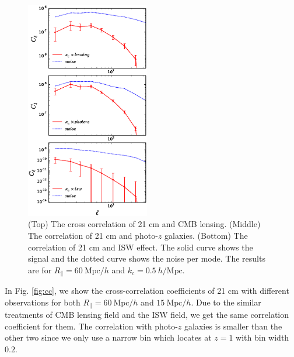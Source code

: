 \documentclass[aps,prl,twocolumn,showpacs,superscriptaddress,groupedaddress,nofootinbib,floatfix]{revtex4}  %
\newcommand{\mr}{\mathrm}
\begin{document}
\begin{figure}[tbp]
\begin{center}
\includegraphics[width=0.48\textwidth]{f8.eps}
\end{center}
\vspace{-1.9cm}
\caption{(Top) The cross correlation of 21 cm and CMB lensing.
(Middle) The correlation of 21 cm and photo-$z$ galaxies. (Bottom) The
correlation of 21 cm and ISW effect. The solid curve shows the signal and the 
dotted curve shows the noise per mode. The results are 
for $R_\parallel=60\ \mr{Mpc}/h$ and $k_c=0.5\ h/\mr{Mpc}$.}
\label{fig:cs}
\end{figure}

In Fig. \ref{fig:cc}, we show the cross-correlation coefficients of 21 cm with 
different observations for both $R_\parallel=60\ \mr{Mpc}/h$ and 
$15\ \mr{Mpc}/h$. Due to the similar treatments of CMB lensing field
and the ISW field, we get the same correlation coefficient for them. 
The correlation with photo-$z$ galaxies is smaller than the other
two since we only use a narrow bin which locates at $z=1$ with bin width $0.2$.
\end{document}
